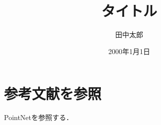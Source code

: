 \documentclass[a4paper,10pt]{jsarticle}
\title{タイトル}%
\author{田中太郎}%
\date{2000年1月1日}%
\begin{document}
\maketitle%

\section{参考文献を参照}
PointNet\cite{point_net}を参照する．

\end{document}
